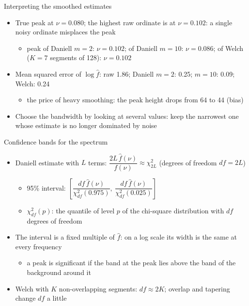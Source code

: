 \begin{frame}{Interpreting the smoothed estimates}
\itemsize{\small}
\begin{itemize}
    \item True peak at $\nu = 0.080$; the highest raw ordinate is at $\nu = 0.102$: a single noisy ordinate misplaces the peak
    \begin{itemize}
        \item peak of Daniell $m = 2$: $\nu = 0.102$; of Daniell $m = 10$: $\nu = 0.086$; of Welch ($K = 7$ segments of 128): $\nu = 0.102$
    \end{itemize}
    \item Mean squared error of $\log\hat f$: raw 1.86; Daniell $m = 2$: 0.25; $m = 10$: 0.09; Welch: 0.24
    \begin{itemize}
        \item the price of heavy smoothing: the peak height drops from 64 to 44 (bias)
    \end{itemize}
    \item Choose the bandwidth by looking at several values: keep the narrowest one whose estimate is no longer dominated by noise
\end{itemize}
\end{frame}

\begin{frame}{Confidence bands for the spectrum}
\itemsize{\footnotesize}
\begin{itemize}
    \item Daniell estimate with $L$ terms: $\dfrac{2L\,\hat f(\nu)}{f(\nu)} \approx \chi^2_{2L}$ (degrees of freedom $df = 2L$)
    \begin{itemize}
        \item 95\% interval: $\left[\dfrac{df\,\hat f(\nu)}{\chi^2_{df}(0.975)},\ \dfrac{df\,\hat f(\nu)}{\chi^2_{df}(0.025)}\right]$
        \item $\chi^2_{df}(p)$: the quantile of level $p$ of the chi-square distribution with $df$ degrees of freedom
    \end{itemize}
    \item The interval is a fixed multiple of $\hat f$: on a log scale its width is the same at every frequency
    \begin{itemize}
        \item a peak is significant if the band at the peak lies above the band of the background around it
    \end{itemize}
    \item Welch with $K$ non-overlapping segments: $df \approx 2K$; overlap and tapering change $df$ a little
\end{itemize}
\end{frame}

